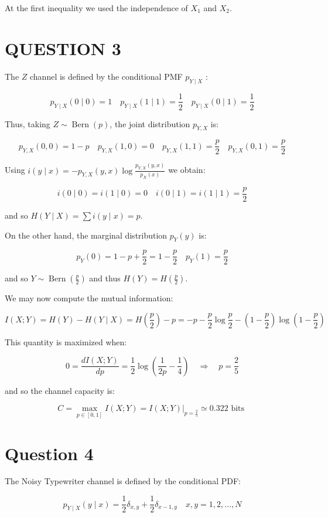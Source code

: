 \documentclass[10pt]{article}
\begin{document}
At the first inequality we used the independence of $X_{1}$ and $X_{2}$.

\section*{QUESTION 3}
The $Z$ channel is defined by the conditional PMF $p_{Y \mid X}$ :

$$
p_{Y \mid X}(0 \mid 0)=1 \quad p_{Y \mid X}(1 \mid 1)=\frac{1}{2} \quad p_{Y \mid X}(0 \mid 1)=\frac{1}{2}
$$

Thus, taking $Z \sim \operatorname{Bern}(p)$, the joint distribution $p_{Y, X}$ is:

$$
p_{Y, X}(0,0)=1-p \quad p_{Y, X}(1,0)=0 \quad p_{Y, X}(1,1)=\frac{p}{2} \quad p_{Y, X}(0,1)=\frac{p}{2}
$$

Using $i(y \mid x)=-p_{Y, X}(y, x) \log \frac{p_{Y, X}(y, x)}{p_{X}(x)}$ we obtain:

$$
i(0 \mid 0)=i(1 \mid 0)=0 \quad i(0 \mid 1)=i(1 \mid 1)=\frac{p}{2}
$$

and so $H(Y \mid X)=\sum i(y \mid x)=p$.

On the other hand, the marginal distribution $p_{Y}(y)$ is:

$$
p_{Y}(0)=1-p+\frac{p}{2}=1-\frac{p}{2} \quad p_{Y}(1)=\frac{p}{2}
$$

and so $Y \sim \operatorname{Bern}\left(\frac{p}{2}\right)$ and thus $H(Y)=H\left(\frac{p}{2}\right)$.

We may now compute the mutual information:

$$
I(X ; Y)=H(Y)-H(Y \mid X)=H\left(\frac{p}{2}\right)-p=-p-\frac{p}{2} \log \frac{p}{2}-\left(1-\frac{p}{2}\right) \log \left(1-\frac{p}{2}\right)
$$

This quantity is maximized when:

$$
0=\frac{d I(X ; Y)}{d p}=\frac{1}{2} \log \left(\frac{1}{2 p}-\frac{1}{4}\right) \quad \Rightarrow \quad p=\frac{2}{5}
$$

and so the channel capacity is:

$$
C=\max _{p \in[0,1]} I(X ; Y)=\left.I(X ; Y)\right|_{p=\frac{2}{5}} \simeq 0.322 \text { bits }
$$

\section*{Question 4}
The Noisy Typewriter channel is defined by the conditional PDF:

$$
p_{Y \mid X}(y \mid x)=\frac{1}{2} \delta_{x, y}+\frac{1}{2} \delta_{x-1, y} \quad x, y=1,2, \ldots, N
$$
\end{document}
